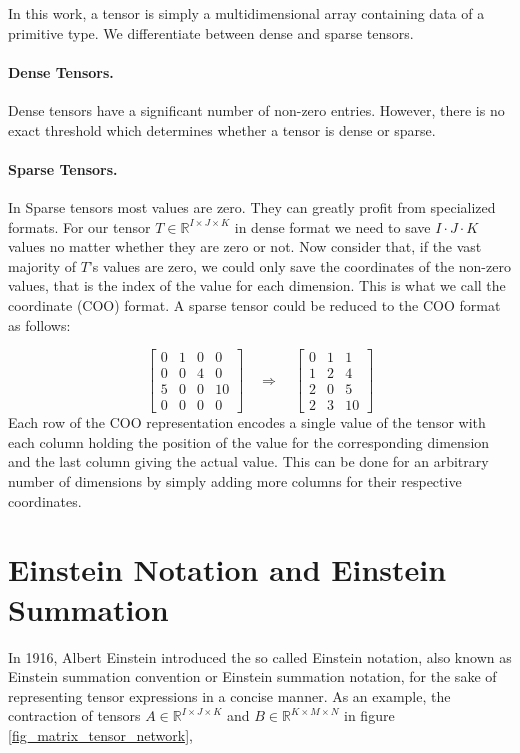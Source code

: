 \noindent
In this work, a tensor is simply a multidimensional array containing data of a
primitive type. We differentiate between dense and sparse tensors.

\paragraph{Dense Tensors.}
Dense tensors have a significant number of non-zero entries. However, there is no
exact threshold which determines whether a tensor is dense or sparse.

\paragraph{Sparse Tensors.}
In Sparse tensors most values are zero. They can greatly profit from specialized
formats. For our tensor $T \in \mathbb{R}^{I \times J \times K}$ in dense format
we need to save $I \cdot J \cdot K$ values no matter whether they are zero or not.
Now consider that, if the vast majority of $T$'s values are zero, we could only save
the coordinates of the non-zero values, that is the index of the value for each
dimension. This is what we call the coordinate (COO) format. A sparse tensor could
be reduced to the COO format as follows:

\begin{equation*}
    \begin{bmatrix}
        0 & 1 & 0 & 0  \\
        0 & 0 & 4 & 0  \\
        5 & 0 & 0 & 10 \\
        0 & 0 & 0 & 0
    \end{bmatrix}
    \quad
    \Rightarrow
    \quad
    \begin{bmatrix}
        0 & 1 & 1  \\
        1 & 2 & 4  \\
        2 & 0 & 5  \\
        2 & 3 & 10
    \end{bmatrix}
\end{equation*}
%
Each row of the COO representation encodes a single value of the tensor with each
column holding the position of the value for the corresponding dimension and the last
column giving the actual value. This can be done for an arbitrary number of dimensions
by simply adding more columns for their respective coordinates.

\section{Einstein Notation and Einstein Summation}
In 1916, Albert Einstein introduced the so called Einstein notation, also known as
Einstein summation convention or Einstein summation notation, for the sake of
representing tensor expressions in a concise manner. As an example, the contraction of tensors
$A \in \mathbb{R}^{I \times J \times K}$ and $B \in \mathbb{R}^{K \times M \times N}$
in figure \ref{fig_matrix_tensor_network},


